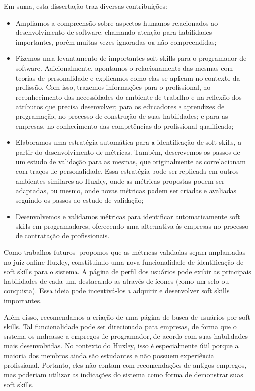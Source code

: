 Em suma, esta dissertação traz diversas contribuições:

\begin{itemize}
 \item Ampliamos a compreensão sobre aspectos humanos relacionados ao desenvolvimento de software, chamando atenção para habilidades importantes, porém muitas vezes ignoradas ou não compreendidas; 

 \item Fizemos uma levantamento de importantes soft skills para o programador de software. Adicionalmente, apontamos o relacionamento das mesmas com teorias de personalidade e explicamos como elas se aplicam no contexto da profissão. Com isso, trazemos informações para o profissional, no reconhecimento das necessidades do ambiente de trabalho e na reflexão dos atributos que precisa desenvolver; para os educadores e aprendizes de programação, no processo de construção de suas habilidades; e para as empresas, no conhecimento das competências do profissional qualificado;

 \item Elaboramos uma estratégia automática para a identificação de soft skills, a partir do desenvolvimento de métricas. Também, descrevemos os passos de um estudo de validação para as mesmas, que originalmente as correlacionam com traços de personalidade.
Essa estratégia pode ser replicada em outros ambientes similares ao Huxley, onde as métricas propostas podem ser adaptadas, ou mesmo, onde novas métricas podem ser criadas e avaliadas seguindo os passos do estudo de validação;

 \item Desenvolvemos e validamos métricas para identificar automaticamente soft skills em programadores, oferecendo uma alternativa às empresas no processo de contratação de profissionais.
\end{itemize}

Como trabalhos futuros, propomos que as métricas validadas sejam implantadas no juiz online Huxley, constituindo uma nova funcionalidade de identificação de soft skills para o sistema. A página de perfil dos usuários pode exibir as principais habilidades de cada um, destacando-as através de ícones (como um selo ou conquista). Essa ideia pode incentivá-los a adquirir e desenvolver soft skills importantes.

Além disso, recomendamos a criação de uma página de busca de usuários por soft skills. Tal funcionalidade pode ser direcionada para empresas, de forma que o sistema os indicasse a empregos de programador, de acordo com suas habilidades mais desenvolvidas. No contexto do Huxley, isso é especialmente útil porque a maioria dos membros ainda são estudantes e não possuem experiência profissional. Portanto, eles não contam com recomendações de antigos empregos, mas poderiam utilizar as indicações do sistema como forma de demonstrar suas soft skills.

